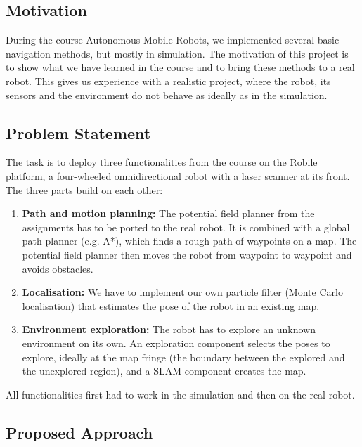 \documentclass[../report.tex]{subfiles}
\begin{document}
    \subsection{Motivation}
    \label{sec:project_description:motivation}

    During the course Autonomous Mobile Robots, we implemented several basic navigation methods, but mostly in simulation.
    The motivation of this project is to show what we have learned in the course and to bring these methods to a real robot.
    This gives us experience with a realistic project, where the robot, its sensors and the environment do not behave as ideally as in the simulation.

    \subsection{Problem Statement}
    \label{sec:project_description:problem_statement}

    The task is to deploy three functionalities from the course on the Robile platform, a four-wheeled omnidirectional robot with a laser scanner at its front.
    The three parts build on each other:
    \begin{enumerate}
        \item \textbf{Path and motion planning:} The potential field planner from the assignments has to be ported to the real robot. It is combined with a global path planner (e.g. A*), which finds a rough path of waypoints on a map. The potential field planner then moves the robot from waypoint to waypoint and avoids obstacles.
        \item \textbf{Localisation:} We have to implement our own particle filter (Monte Carlo localisation) that estimates the pose of the robot in an existing map.
        \item \textbf{Environment exploration:} The robot has to explore an unknown environment on its own. An exploration component selects the poses to explore, ideally at the map fringe (the boundary between the explored and the unexplored region), and a SLAM component creates the map.
    \end{enumerate}
    All functionalities first had to work in the simulation and then on the real robot.

    \subsection{Proposed Approach}
    \label{sec:project_description:proposed_approach}
\end{document}
